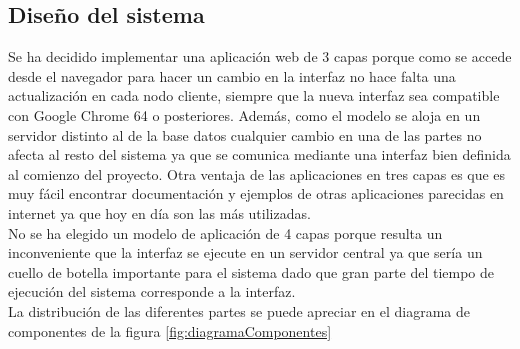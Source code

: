 \subsection{Diseño del sistema}
Se ha decidido implementar una aplicación web de 3 capas porque como se accede desde el navegador para hacer un cambio en la interfaz no hace falta una actualización en cada nodo cliente, siempre que la nueva interfaz sea compatible con Google Chrome 64 o posteriores. Además, como el modelo se aloja en un servidor distinto al de la base datos cualquier cambio en una de las partes no afecta al resto del sistema ya que se comunica mediante una interfaz bien definida al comienzo del proyecto. 
Otra ventaja de las aplicaciones en tres capas es que es muy fácil encontrar documentación y ejemplos de otras aplicaciones parecidas en internet ya que hoy en día son las más utilizadas. \\
No se ha elegido un modelo de aplicación de 4 capas porque resulta un inconveniente que la interfaz se ejecute en un servidor central ya que sería un cuello de botella importante para el sistema dado que gran parte del tiempo de ejecución del sistema corresponde a la interfaz. \\

La distribución de las diferentes partes se puede apreciar en el diagrama de componentes de la figura \ref{fig:diagramaComponentes}

